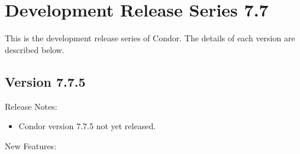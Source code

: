 
\section{\label{sec:History-7-7}Development Release Series 7.7}

This is the development release series of Condor.
The details of each version are described below.


\subsection*{\label{sec:New-7-7-5}Version 7.7.5}

\noindent Release Notes:

\begin{itemize}

\item Condor version 7.7.5 not yet released.

\end{itemize}


\noindent New Features:


